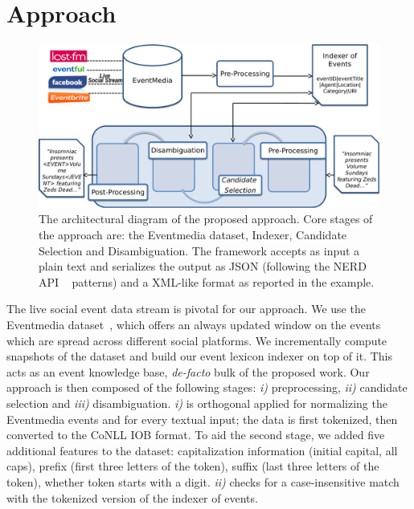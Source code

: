 \documentclass[10pt,a4paper]{article}
\begin{document}
\section{Approach}
\begin{figure}
\includegraphics[width=\textwidth]{architecture.pdf}
\caption{The architectural diagram of the proposed approach. Core stages of the approach are: the Eventmedia dataset, Indexer, Candidate Selection and Disambiguation. The framework accepts as input a plain text and serializes the output as JSON (following the NERD API ~\cite{RIZZO:2012} patterns) and a XML-like format as reported in the example.}
\label{fig:architecture}
\end{figure}
The live social event data stream is pivotal for our approach. We use the Eventmedia dataset~\cite{krouf2012}, which offers an always updated window on the events which are spread across different social platforms. We incrementally compute snapshots of the dataset and build our event lexicon indexer on top of it. This acts as an event knowledge base, \textit{de-facto} bulk of the proposed work. Our approach is then composed of the following stages: \textit{i)} preprocessing, \textit{ii)} candidate selection and \textit{iii)} disambiguation. \textit{i)} is orthogonal applied for normalizing the Eventmedia events and for every textual input; the data is first tokenized, then converted to the CoNLL IOB format. To aid the second stage, we added five additional features to the dataset: capitalization information (initial capital, all caps), prefix (first three letters of the token), suffix (last three letters of the token), whether token starts with a digit.
\textit{ii)} checks for a case-insensitive match with the tokenized version of the indexer of events. 
\end{document}
